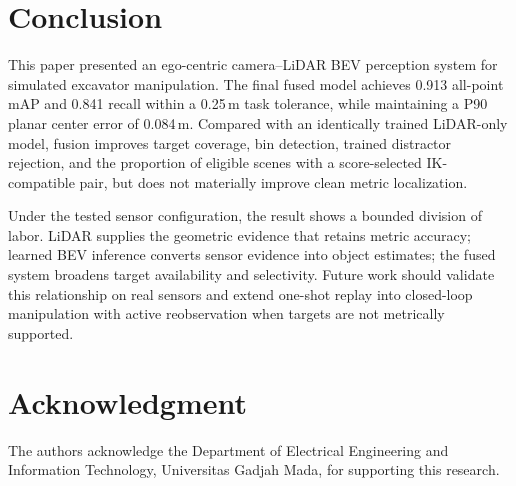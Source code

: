\documentclass[conference]{IEEEtran}
\begin{document}
\section{Conclusion}

This paper presented an ego-centric camera--LiDAR BEV perception system for simulated excavator manipulation. The final fused model achieves 0.913 all-point mAP and 0.841 recall within a 0.25\,m task tolerance, while maintaining a P90 planar center error of 0.084\,m. Compared with an identically trained LiDAR-only model, fusion improves target coverage, bin detection, trained distractor rejection, and the proportion of eligible scenes with a score-selected IK-compatible pair, but does not materially improve clean metric localization.

Under the tested sensor configuration, the result shows a bounded division of labor. LiDAR supplies the geometric evidence that retains metric accuracy; learned BEV inference converts sensor evidence into object estimates; the fused system broadens target availability and selectivity. Future work should validate this relationship on real sensors and extend one-shot replay into closed-loop manipulation with active reobservation when targets are not metrically supported.

\section*{Acknowledgment}

The authors acknowledge the Department of Electrical Engineering and Information Technology, Universitas Gadjah Mada, for supporting this research.

\balance


\end{document}

